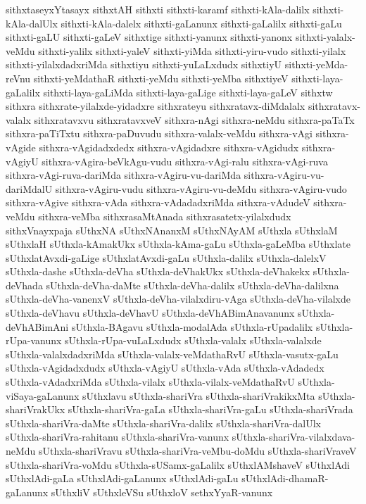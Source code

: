 {sithxtaseyxYtasayx
sithxtAH
sithxti
sithxti-karamf
sithxti-kAla-dalilx
sithxti-kAla-dalUlx
sithxti-kAla-dalelx
sithxti-gaLanunx
sithxti-gaLalilx
sithxti-gaLu
sithxti-gaLU
sithxti-gaLeV
sithxtige
sithxti-yanunx
sithxti-yanonx
sithxti-yalalx-veMdu
sithxti-yalilx
sithxti-yaleV
sithxti-yiMda
sithxti-yiru-vudo
sithxti-yilalx
sithxti-yilalxdadxriMda
sithxtiyu
sithxti-yuLaLxdudx
sithxtiyU
sithxti-yeMda-reVnu
sithxti-yeMdathaR
sithxti-yeMdu
sithxti-yeMba
sithxtiyeV
sithxti-laya-gaLalilx
sithxti-laya-gaLiMda
sithxti-laya-gaLige
sithxti-laya-gaLeV
sithxtw
sithxra
sithxrate-yilalxde-yidadxre
sithxrateyu
sithxratavx-diMdalalx
sithxratavx-valalx
sithxratavxvu
sithxratavxveV
sithxra-nAgi
sithxra-neMdu
sithxra-paTaTx
sithxra-paTiTxtu
sithxra-paDuvudu
sithxra-valalx-veMdu
sithxra-vAgi
sithxra-vAgide
sithxra-vAgidadxdedx
sithxra-vAgidadxre
sithxra-vAgidudx
sithxra-vAgiyU
sithxra-vAgira-beVkAgu-vudu
sithxra-vAgi-ralu
sithxra-vAgi-ruva
sithxra-vAgi-ruva-dariMda
sithxra-vAgiru-vu-dariMda
sithxra-vAgiru-vu-dariMdalU
sithxra-vAgiru-vudu
sithxra-vAgiru-vu-deMdu
sithxra-vAgiru-vudo
sithxra-vAgive
sithxra-vAda
sithxra-vAdadadxriMda
sithxra-vAdudeV
sithxra-veMdu
sithxra-veMba
sithxrasaMtAnada
sithxrasatetx-yilalxdudx
sithxVnayxpaja
sUthxNA
sUthxNAnanxM
sUthxNAyAM
sUthxla
sUthxlaM
sUthxlaH
sUthxla-kAmakUkx
sUthxla-kAma-gaLu
sUthxla-gaLeMba
sUthxlate
sUthxlatAvxdi-gaLige
sUthxlatAvxdi-gaLu
sUthxla-dalilx
sUthxla-dalelxV
sUthxla-dashe
sUthxla-deVha
sUthxla-deVhakUkx
sUthxla-deVhakekx
sUthxla-deVhada
sUthxla-deVha-daMte
sUthxla-deVha-dalilx
sUthxla-deVha-dalilxna
sUthxla-deVha-vanenxV
sUthxla-deVha-vilalxdiru-vAga
sUthxla-deVha-vilalxde
sUthxla-deVhavu
sUthxla-deVhavU
sUthxla-deVhABimAnavanunx
sUthxla-deVhABimAni
sUthxla-BAgavu
sUthxla-modalAda
sUthxla-rUpadalilx
sUthxla-rUpa-vanunx
sUthxla-rUpa-vuLaLxdudx
sUthxla-valalx
sUthxla-valalxde
sUthxla-valalxdadxriMda
sUthxla-valalx-veMdathaRvU
sUthxla-vasutx-gaLu
sUthxla-vAgidadxdudx
sUthxla-vAgiyU
sUthxla-vAda
sUthxla-vAdadedx
sUthxla-vAdadxriMda
sUthxla-vilalx
sUthxla-vilalx-veMdathaRvU
sUthxla-viSaya-gaLanunx
sUthxlavu
sUthxla-shariVra
sUthxla-shariVrakikxMta
sUthxla-shariVrakUkx
sUthxla-shariVra-gaLa
sUthxla-shariVra-gaLu
sUthxla-shariVrada
sUthxla-shariVra-daMte
sUthxla-shariVra-dalilx
sUthxla-shariVra-dalUlx
sUthxla-shariVra-rahitanu
sUthxla-shariVra-vanunx
sUthxla-shariVra-vilalxdava-neMdu
sUthxla-shariVravu
sUthxla-shariVra-veMbu-doMdu
sUthxla-shariVraveV
sUthxla-shariVra-voMdu
sUthxla-sUSamx-gaLalilx
sUthxlAMshaveV
sUthxlAdi
sUthxlAdi-gaLa
sUthxlAdi-gaLanunx
sUthxlAdi-gaLu
sUthxlAdi-dhamaR-gaLanunx
sUthxliV
sUthxleVSu
sUthxloV
sethxYyaR-vanunx
}

